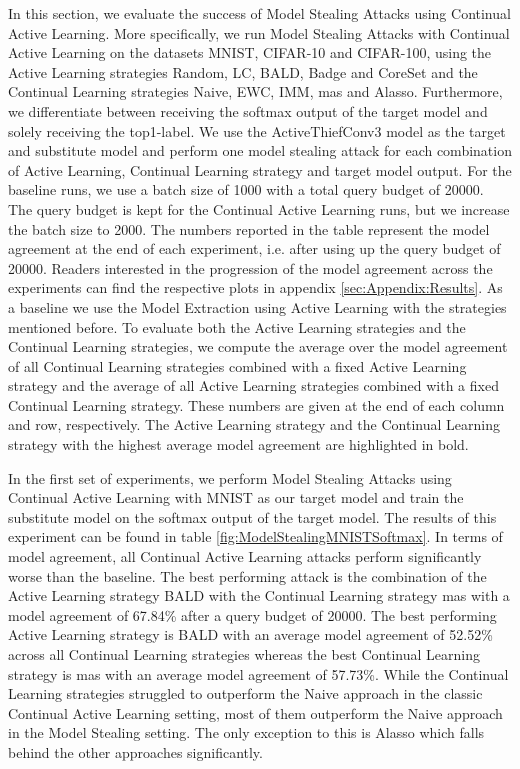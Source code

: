 In this section, we evaluate the success of Model Stealing Attacks using Continual Active Learning. More specifically, we run Model Stealing Attacks with Continual Active Learning on the datasets MNIST, CIFAR-10 and CIFAR-100, using the Active Learning strategies
Random, LC, BALD, Badge and CoreSet and the Continual Learning strategies Naive, EWC, IMM, \gls{mas} and Alasso. Furthermore, we differentiate between receiving the softmax output of the target model and solely receiving the top1-label. We use the ActiveThiefConv3 model
as the target and substitute model and perform one model stealing attack for each combination of Active Learning, Continual Learning strategy and target model output. For the baseline runs, we use a batch size of 1000 with a total query budget of 20000. The query budget
is kept for the Continual Active Learning runs, but we increase the batch size to 2000. The numbers reported in the table represent the model agreement at the end of each experiment, i.e. after using up the query budget of 20000. Readers interested in the progression of the
model agreement across the experiments can find the respective plots in appendix \ref{sec:Appendix:Results}. As a baseline we use the Model Extraction using Active Learning with the strategies mentioned before. To evaluate both the Active Learning strategies and the Continual
Learning strategies, we compute the average over the model agreement of all Continual Learning strategies combined with a fixed Active Learning strategy and the average of all Active Learning strategies combined with a fixed Continual Learning strategy. These numbers are given
at the end of each column and row, respectively. The Active Learning strategy and the Continual Learning strategy with the highest average model agreement are highlighted in bold. \par
In the first set of experiments, we perform Model Stealing Attacks using Continual Active Learning with MNIST as our target model and train the substitute model on the softmax output of the target model. The results of this experiment can be found in table
\ref{fig:ModelStealingMNISTSoftmax}. In terms of model agreement, all Continual Active Learning attacks perform significantly worse than the baseline. The best performing attack is the combination of the Active Learning strategy BALD with the Continual Learning strategy
\gls{mas} with a model agreement of 67.84\% after a query budget of 20000. The best performing Active Learning strategy is BALD with an average model agreement of 52.52\% across all Continual Learning strategies whereas the best Continual Learning strategy is \gls{mas} with an average
model agreement of 57.73\%. While the Continual Learning strategies struggled to outperform the Naive approach in the classic Continual Active Learning setting, most of them outperform the Naive approach in the Model Stealing setting. The only exception to this is Alasso which
falls behind the other approaches significantly. \par 

